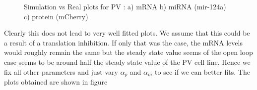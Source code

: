 \documentclass{article}
\begin{document}
\begin{figure}[h!]
\caption{Simulation vs Real plots for PV : a) mRNA b) miRNA (mir-124a) c) protein (mCherry)}
\label{resultsPV_FishOpen}
\end{figure}
 
Clearly this does not lead to very well fitted plots. We assume that this could be a result of a translation inhibition. If only that was the case, the mRNA levels would roughly remain the same but the steady state value seems of the open loop case seems to be around half the steady state value of the PV cell line. Hence we fix all other parameters and just vary $\alpha_p$ and $\alpha_m$ to see if we can better fits. The plots obtained are shown in figure 
\end{document}

